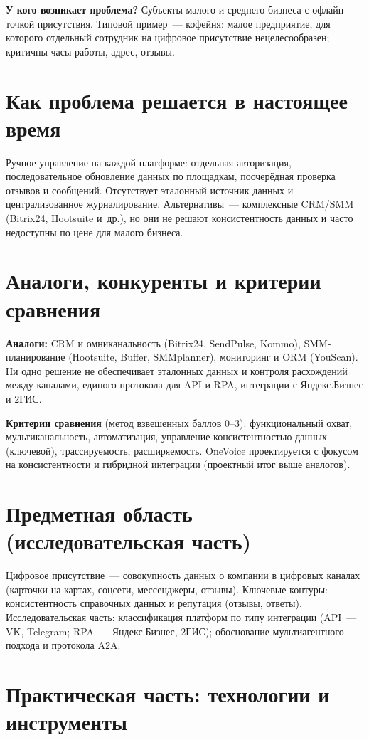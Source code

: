 \textbf{У кого возникает проблема?} Субъекты малого и среднего бизнеса с офлайн-точкой присутствия. Типовой пример~--- кофейня: малое предприятие, для которого отдельный сотрудник на цифровое присутствие нецелесообразен; критичны часы работы, адрес, отзывы.

\section{Как проблема решается в настоящее время}

Ручное управление на каждой платформе: отдельная авторизация, последовательное обновление данных по площадкам, поочерёдная проверка отзывов и сообщений. Отсутствует эталонный источник данных и централизованное журналирование. Альтернативы~--- комплексные CRM/SMM (Bitrix24, Hootsuite и~др.), но они не решают консистентность данных и часто недоступны по цене для малого бизнеса.

\section{Аналоги, конкуренты и критерии сравнения}

\textbf{Аналоги:} CRM и омниканальность (Bitrix24, SendPulse, Kommo), SMM-планирование (Hootsuite, Buffer, SMMplanner), мониторинг и ORM (YouScan). Ни одно решение не обеспечивает эталонных данных и контроля расхождений между каналами, единого протокола для API и RPA, интеграции с Яндекс.Бизнес и 2ГИС.

\textbf{Критерии сравнения} (метод взвешенных баллов 0--3): функциональный охват, мультиканальность, автоматизация, управление консистентностью данных (ключевой), трассируемость, расширяемость. OneVoice проектируется с фокусом на консистентности и гибридной интеграции (проектный итог выше аналогов).

\section{Предметная область (исследовательская часть)}

Цифровое присутствие~--- совокупность данных о компании в цифровых каналах (карточки на картах, соцсети, мессенджеры, отзывы). Ключевые контуры: консистентность справочных данных и репутация (отзывы, ответы). Исследовательская часть: классификация платформ по типу интеграции (API~--- VK, Telegram; RPA~--- Яндекс.Бизнес, 2ГИС); обоснование мультиагентного подхода и протокола A2A.

\section{Практическая часть: технологии и инструменты}

